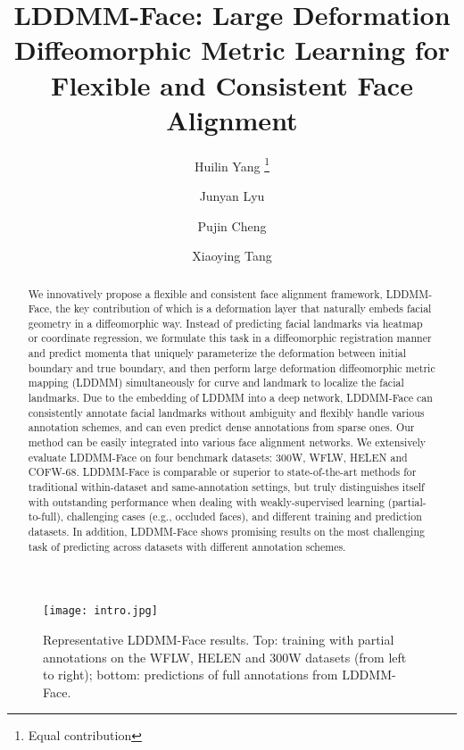 \documentclass[10pt,twocolumn,letterpaper]{article}
\newcommand*\samethanks[1][\value{footnote}]{\footnotemark[#1]}
\begin{document}
\title{LDDMM-Face: Large Deformation Diffeomorphic Metric Learning for Flexible and Consistent Face Alignment}

\author[1,2]{Huilin Yang \thanks{Equal contribution}}
\author[1,3]{Junyan Lyu \samethanks}
\author[1]{Pujin Cheng}
\author[1]{Xiaoying Tang}



\maketitle
\ificcvfinal\thispagestyle{empty}\fi

\begin{abstract}
   We innovatively propose a flexible and consistent face alignment framework, LDDMM-Face, the key contribution of which is a deformation layer that naturally embeds facial geometry in a diffeomorphic way. Instead of predicting facial landmarks via heatmap or coordinate regression, we formulate this task in a diffeomorphic registration manner and predict momenta that uniquely parameterize the deformation between initial boundary and true boundary, and then perform large deformation diffeomorphic metric mapping (LDDMM) simultaneously for curve and landmark to localize the facial landmarks. Due to the embedding of LDDMM into a deep network, LDDMM-Face can consistently annotate facial landmarks without ambiguity and flexibly handle various annotation schemes, and can even predict dense annotations from sparse ones. Our method can be easily integrated into various face alignment networks. We extensively evaluate LDDMM-Face on four benchmark datasets: 300W, WFLW, HELEN and COFW-68. LDDMM-Face is comparable or superior to state-of-the-art methods for traditional within-dataset and same-annotation settings, but truly distinguishes itself with outstanding performance when dealing with weakly-supervised learning (partial-to-full), challenging cases (e.g., occluded faces), and different training and prediction datasets. In addition, LDDMM-Face shows promising results on the most challenging task of predicting across datasets with different annotation schemes.\end{abstract}

\begin{figure}[thbp]
\begin{center}
  \texttt{[image: intro.jpg]}
\end{center}
  \caption{Representative LDDMM-Face results. Top: training with partial annotations on the WFLW, HELEN and 300W datasets (from left to right); bottom: predictions of full annotations from LDDMM-Face.}
\label{fig:intro}
\end{figure}
\end{document}
